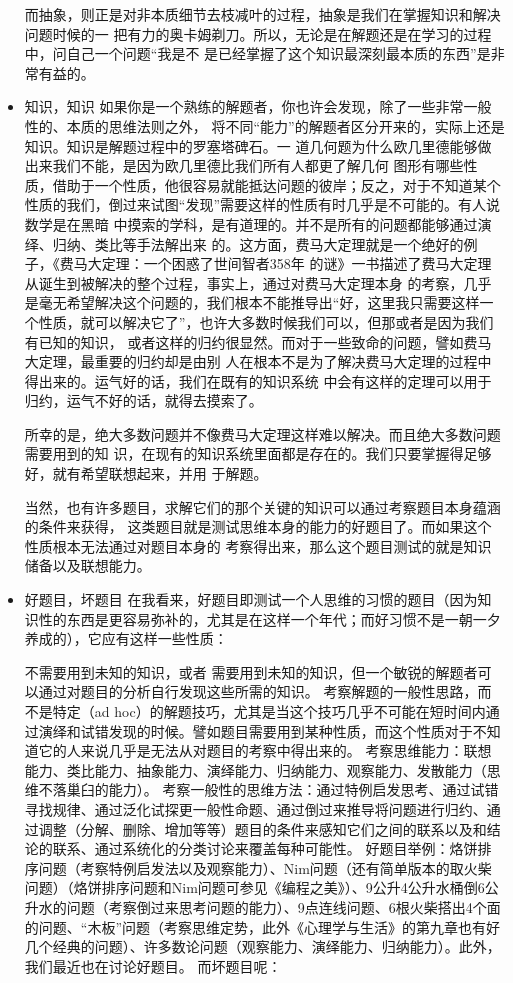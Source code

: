 \documentclass[11pt]{article}
\begin{document}
\begin{itemize}
而抽象，则正是对非本质细节去枝减叶的过程，抽象是我们在掌握知识和解决问题时候的一
把有力的奥卡姆剃刀。所以，无论是在解题还是在学习的过程中，问自己一个问题“我是不
是已经掌握了这个知识最深刻最本质的东西”是非常有益的。
\item 知识，知识
\label{sec:orgheadline202}
如果你是一个熟练的解题者，你也许会发现，除了一些非常一般性的、本质的思维法则之外，
将不同“能力”的解题者区分开来的，实际上还是知识。知识是解题过程中的罗塞塔碑石。一
道几何题为什么欧几里德能够做出来我们不能，是因为欧几里德比我们所有人都更了解几何
图形有哪些性质，借助于一个性质，他很容易就能抵达问题的彼岸；反之，对于不知道某个
性质的我们，倒过来试图“发现”需要这样的性质有时几乎是不可能的。有人说数学是在黑暗
中摸索的学科，是有道理的。并不是所有的问题都能够通过演绎、归纳、类比等手法解出来
的。这方面，费马大定理就是一个绝好的例子，《费马大定理：一个困惑了世间智者358年
的谜》一书描述了费马大定理从诞生到被解决的整个过程，事实上，通过对费马大定理本身
的考察，几乎是毫无希望解决这个问题的，我们根本不能推导出“好，这里我只需要这样一
个性质，就可以解决它了”，也许大多数时候我们可以，但那或者是因为我们有已知的知识，
或者这样的归约很显然。而对于一些致命的问题，譬如费马大定理，最重要的归约却是由别
人在根本不是为了解决费马大定理的过程中得出来的。运气好的话，我们在既有的知识系统
中会有这样的定理可以用于归约，运气不好的话，就得去摸索了。

所幸的是，绝大多数问题并不像费马大定理这样难以解决。而且绝大多数问题需要用到的知
识，在现有的知识系统里面都是存在的。我们只要掌握得足够好，就有希望联想起来，并用
于解题。

当然，也有许多题目，求解它们的那个关键的知识可以通过考察题目本身蕴涵的条件来获得，
这类题目就是测试思维本身的能力的好题目了。而如果这个性质根本无法通过对题目本身的
考察得出来，那么这个题目测试的就是知识储备以及联想能力。
\item 好题目，坏题目
\label{sec:orgheadline203}
在我看来，好题目即测试一个人思维的习惯的题目（因为知识性的东西是更容易弥补的，尤其是在这样一个年代；而好习惯不是一朝一夕养成的），它应有这样一些性质：

不需要用到未知的知识，或者
需要用到未知的知识，但一个敏锐的解题者可以通过对题目的分析自行发现这些所需的知识。
考察解题的一般性思路，而不是特定（ad hoc）的解题技巧，尤其是当这个技巧几乎不可能在短时间内通过演绎和试错发现的时候。譬如题目需要用到某种性质，而这个性质对于不知道它的人来说几乎是无法从对题目的考察中得出来的。
考察思维能力：联想能力、类比能力、抽象能力、演绎能力、归纳能力、观察能力、发散能力（思维不落巢臼的能力）。
考察一般性的思维方法：通过特例启发思考、通过试错寻找规律、通过泛化试探更一般性命题、通过倒过来推导将问题进行归约、通过调整（分解、删除、增加等等）题目的条件来感知它们之间的联系以及和结论的联系、通过系统化的分类讨论来覆盖每种可能性。
好题目举例：烙饼排序问题（考察特例启发法以及观察能力）、Nim问题（还有简单版本的取火柴问题）（烙饼排序问题和Nim问题可参见《编程之美》）、9公升4公升水桶倒6公升水的问题（考察倒过来思考问题的能力）、9点连线问题、6根火柴搭出4个面的问题、“木板”问题（考察思维定势，此外《心理学与生活》的第九章也有好几个经典的问题）、许多数论问题（观察能力、演绎能力、归纳能力）。此外，我们最近也在讨论好题目。
而坏题目呢：


\end{itemize}
\end{document}

